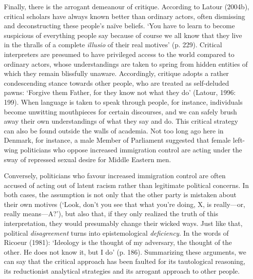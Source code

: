 \begin{adjmulticols}{2}{0mm}{0mm}
Finally, there is the arrogant demeanour of critique. According to Latour (2004b), critical scholars have always known better than ordinary actors, often dismissing and deconstructing these people’s naïve beliefs. ‘You have to learn to become suspicious of everything people say because of course we all know that they live in the thralls of a complete \textit{illusio} of their real motives’ (p. 229). Critical interpreters are presumed to have privileged access to the world compared to ordinary actors, whose understandings are taken to spring from hidden entities of which they remain blissfully unaware. Accordingly, critique adopts a rather condescending stance towards other people, who are treated as self-deluded pawns: ‘Forgive them Father, for they know not what they do’ (Latour, 1996: 199). When language is taken to speak through people, for instance, individuals become unwitting mouthpieces for certain discourses, and we can safely brush away their own understandings of what they say and do. This critical strategy can also be found outside the walls of academia. Not too long ago here in Denmark, for instance, a male Member of Parliament suggested that female left-wing politicians who oppose increased immigration control are acting under the sway of repressed sexual desire for Middle Eastern men.%
\par
Conversely, politicians who favour increased immigration control are often accused of acting out of latent racism rather than legitimate political concerns. In both cases, the assumption is not only that the other party is mistaken about their own motives (‘Look, don’t you see that what you’re doing, X, is really—or, really means—A?’), but also that, if they only realized the truth of this interpretation, they would presumably change their wicked ways. Just like that, political \textit{disagreement} turns into epistemological \textit{deficiency}. In the words of Ricoeur (1981): ‘Ideology is the thought of my adversary, the thought of the other. He does not know it, but I do’ (p. 186). Summarizing these arguments, we can say that the critical approach has been faulted for its tautological reasoning, its reductionist analytical strategies and its arrogant approach to other people.


\end{adjmulticols}
